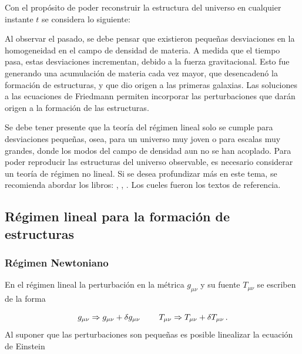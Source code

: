 Con el propósito de poder reconstruir la estructura del universo en cualquier instante $t$ se considera lo siguiente:

Al observar el pasado, se debe pensar que existieron pequeñas desviaciones en la homogeneidad en el campo de densidad de materia. A medida que el tiempo pasa, estas desviaciones incrementan, debido a la fuerza gravitacional. Esto fue generando una acumulación de materia cada vez mayor, que desencadenó la formación de estructuras, y que dio origen a las primeras galaxias. Las soluciones a las ecuaciones de Friedmann permiten incorporar las perturbaciones que darán origen a la formación de las estructuras.

Se debe tener presente que la teoría del régimen lineal solo se cumple para desviaciones pequeñas, osea, para un universo muy joven o para escalas muy grandes, donde los modos del campo de densidad aun no se han acoplado. Para poder reproducir las estructuras del universo observable, es necesario considerar un teoría de régimen no lineal. Si se desea profundizar más en este tema, se recomienda abordar los libros: \cite{padmanabhan1995}, \cite{longair2008}, \cite{coles2002}. Los cueles fueron los textos de referencia.


\subsection{Régimen lineal para la formación de estructuras}
\label{subsec:Lineal_Estructure_Formation}


	\subsubsection{Régimen Newtoniano}
	\label{subsubsec:Newtonian_Regimen}


En el régimen lineal la perturbación en la métrica $g_{\mu\nu}$ y su fuente $T_{\mu\nu}$ se escriben de la forma

\begin{equation}
g_{\mu\nu} \Rightarrow g_{\mu\nu}+\delta g_{\mu\nu} \hspace{0.8cm} T_{\mu\nu} \Rightarrow T_{\mu\nu} +\delta T_{\mu\nu} \,.
\end{equation}
%
Al suponer que las perturbaciones son pequeñas es posible linealizar la ecuación de Einstein 

